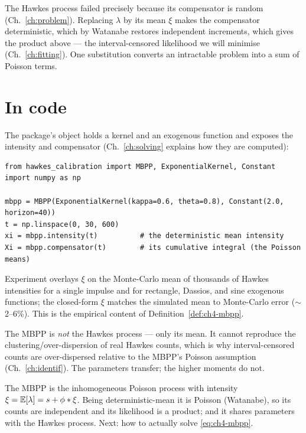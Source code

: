 \begin{whybox}
The Hawkes process failed precisely because its compensator is random
(Ch.~\ref{ch:problem}). Replacing $\lambda$ by its mean $\xi$ makes the compensator
deterministic, which by Watanabe restores independent increments, which gives the
product above --- the interval-censored likelihood we will minimise
(Ch.~\ref{ch:fitting}). One substitution converts an intractable problem into a sum
of Poisson terms.
\end{whybox}

\section{In code}

The package's  object holds a kernel and an exogenous function and
exposes the intensity and compensator (Ch.~\ref{ch:solving} explains how they are
computed):

\begin{lstlisting}[caption={Constructing and evaluating an MBPP.}]
from hawkes_calibration import MBPP, ExponentialKernel, Constant
import numpy as np

mbpp = MBPP(ExponentialKernel(kappa=0.6, theta=0.8), Constant(2.0, horizon=40))
t = np.linspace(0, 30, 600)
xi = mbpp.intensity(t)          # the deterministic mean intensity
Xi = mbpp.compensator(t)        # its cumulative integral (the Poisson means)
\end{lstlisting}

\begin{examplebox}
Experiment  overlays $\xi$ on the Monte-Carlo mean of
thousands of Hawkes intensities for a single impulse and for rectangle, Dassios,
and sine exogenous functions; the closed-form $\xi$ matches the simulated mean to
Monte-Carlo error ($\sim$2--6\%). This is the empirical content of
Definition~\ref{def:ch4-mbpp}.
\end{examplebox}

\begin{pitfall}
The MBPP is \emph{not} the Hawkes process --- only its mean. It cannot reproduce the
clustering/over-dispersion of real Hawkes counts, which is why interval-censored
counts are over-dispersed relative to the MBPP's Poisson assumption
(Ch.~\ref{ch:identif}). The parameters transfer; the higher moments do not.
\end{pitfall}

\begin{recap}
The MBPP is the inhomogeneous Poisson process with intensity
$\xi=\mathbb{E}[\lambda]=s+\phi*\xi$. Being deterministic-mean it is Poisson (Watanabe), so
its counts are independent and its likelihood is a product; and it shares
parameters with the Hawkes process. Next: how to actually solve
\eqref{eq:ch4-mbpp}.
\end{recap}

